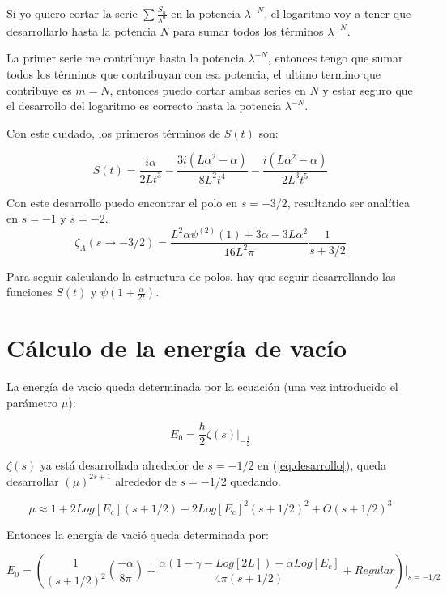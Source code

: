 Si yo quiero cortar la serie $\sum \frac{S _n}{\lambda ^n}$ en la potencia $\lambda ^{-N}$, el logaritmo voy a tener que desarrollarlo hasta la potencia $N$ para sumar todos los términos $\lambda ^{-N}$.

La primer serie me contribuye hasta la potencia $\lambda ^{-N}$, entonces tengo que sumar todos los términos que contribuyan con esa potencia, el ultimo termino que contribuye es $m=N$, entonces puedo cortar ambas series en $N$ y estar seguro que el desarrollo del logaritmo es correcto hasta la potencia $\lambda ^{-N}$.

Con este cuidado, los primeros términos de $S(t)$ son:

\begin{equation}
S(t) = 
\frac{i \alpha}{2 L t^3} -
\frac{3 i (L \alpha ^2 - \alpha)}{8 L^2 t ^4} -
\frac{i ( L \alpha ^2 - \alpha )}{2 L^3 t^5}
\end{equation}

Con este desarrollo puedo encontrar el polo en $s=-3/2$, resultando ser analítica en $s=-1$ y $s=-2$.
\begin{equation}
\zeta _A (s \rightarrow -3/2) = 
\frac{L ^2 \alpha \psi ^{(2)} (1) + 3 \alpha - 3 L \alpha ^2}{16 L^2 \pi}
\frac{1}{s+3/2}
\end{equation}

Para seguir calculando la estructura de polos, hay que seguir desarrollando las funciones $S(t)$ y $\psi (1 + \frac{\alpha}{2 t})$.

\section{Cálculo de la energía de vacío}

La energía de vacío queda determinada por la ecuación (una vez introducido el parámetro $\mu$): 

\begin{equation}
    E _0 = \frac{\hbar}{2}  
    \zeta (s)  |  _{- \frac{1}{2}}
\end{equation}

$\zeta (s)$ ya está desarrollada alrededor de $s=-1/2$ en (\ref{eq.desarrollo}), queda desarrollar $(\mu) ^{2s+1} $ alrededor de $s=-1/2$ quedando.

\begin{equation}
    \mu \approx 
    1 + 2 Log[E_c] (s + 1/2) +
    2 Log[E_c] ^2 (s+1/2) ^2 + 
    O (s+1/2)^3
\end{equation}

Entonces la energía de vació queda determinada por:

\begin{equation}
    E _0 =
    \left(
    \frac{1}{(s+1/2)^2} 
    \left(
    \frac{- \alpha}{8 \pi}
    \right)+
    \frac{
    \alpha(1 -\gamma-Log[2L]) - 
    \alpha Log[E_c] 
    }{4 \pi (s+1/2)} 
     + Regular
    \right) | _{s=-1/2}
\end{equation}\\



 

